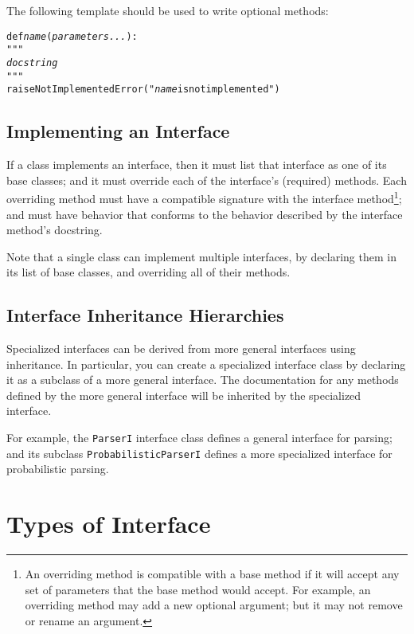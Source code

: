 \documentclass[11pt]{article}
\begin{document}
\noindent
The following template should be used to write optional methods:

\begin{alltt}
    def \textit{name}(\textit{parameters...}):
        """
        \textit{docstring}
        """
        raise NotImplementedError("\textit{name} is not implemented")
\end{alltt}

\subsection{Implementing an Interface}

If a class implements an interface, then it must list that interface
as one of its base classes; and it must override each of the
interface's (required) methods.  Each overriding method must have a
compatible signature with the interface method\footnote{An overriding
  method is compatible with a base method if it will accept any set of
  parameters that the base method would accept.  For example, an
  overriding method may add a new optional argument; but it may not
  remove or rename an argument.}; and must have behavior that conforms
to the behavior described by the interface method's docstring.

Note that a single class can implement multiple interfaces, by
declaring them in its list of base classes, and overriding all of
their methods.

\subsection{Interface Inheritance Hierarchies}

Specialized interfaces can be derived from more general interfaces
using inheritance.  In particular, you can create a specialized
interface class by declaring it as a subclass of a more general
interface.  The documentation for any methods defined by the more
general interface will be inherited by the specialized interface.

For example, the \texttt{ParserI} interface class defines a general
interface for parsing; and its subclass \texttt{ProbabilisticParserI}
defines a more specialized interface for probabilistic parsing.

\section{Types of Interface}
\end{document}

